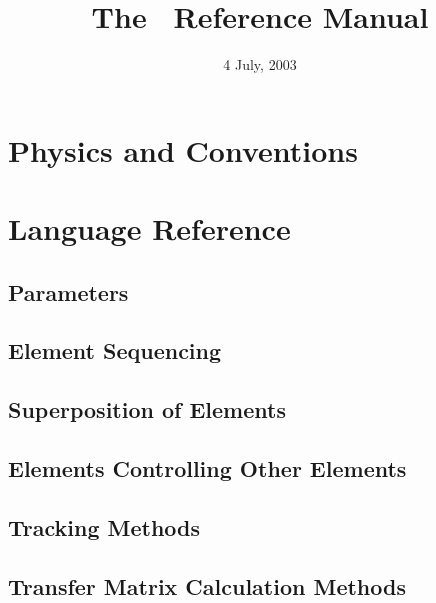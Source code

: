 \documentclass{book}
\begin{document}
\title{The \bmad\ Reference Manual}

\date{4 July, 2003}
\maketitle



\tableofcontents
\listoffigures
\listoftables

\part{Physics and Conventions}



\part{Language Reference}


\chapter{Parameters}

\chapter{Element Sequencing}
\chapter{Superposition of Elements}
\chapter{Elements Controlling Other Elements}
\chapter{Tracking Methods}
\chapter{Transfer Matrix Calculation Methods}


\end{document}
